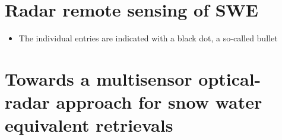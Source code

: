 \hypertarget{ch1-intro-2}{\section{Radar remote sensing of SWE}\label{ch1-intro-1}}
\begin{enumerate}
   \begin{itemize}
     \item The individual entries are indicated with a black dot, a so-called bullet
   \end{itemize}
\end{enumerate}

\hypertarget{ch1-intro-2}{\section{Towards a multisensor optical-radar approach for snow water equivalent retrievals}\label{ch1-intro-2}}










